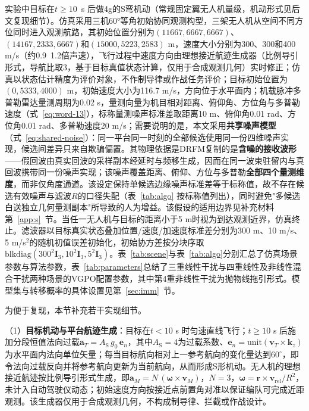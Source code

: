 \documentclass[UTF8,a4paper,zihao=-4]{ctexart}
\begin{document}
实验中目标在\(t\ge10\)~s 后做4g的S弯机动（常规固定翼无人机量级，机动形式见后文复现细节）。仿真采用三机60°等角初始协同观测构型，三架无人机从空间不同方位同时进入观测航路，其初始位置分别为\((11667,6667,6667)\)、\((14167,2333,6667)\)和\((15000,5223,2583)\) m，速度大小分别为300、300和400 m/s（约0.9~1.2倍声速），飞行过程中速度方向由理想接近航迹生成器（比例导引形式，导航比取3，基于目标真值状态计算，仅用于合成观测几何）实时修正；仿真以状态估计精度为评价对象，不作制导律或作战任务评价；目标初始位置为\((0,5333,4000)\) m，初始速度大小为116.7 m/s，方向位于水平面内；机载脉冲多普勒雷达量测周期为0.02 s，量测向量为机目相对距离、俯仰角、方位角与多普勒速度（式~\eqref{eq:word-13}），标称量测噪声标准差取距离10 m、俯仰角0.01 rad、方位角0.01 rad、多普勒速度20 m/s；需要说明的是，本文采用\textbf{共享噪声模型}（式~\eqref{eq:shared-noise}）：同一平台同一时刻的全部候选使用同一份四维噪声实现，候选间差异只来自欺骗偏置。其物理依据是DRFM复制的是\textbf{含噪的接收波形}——假回波由真实回波的采样副本经延时与频移生成，因而在同一波束驻留内与真回波携带同一份噪声实现；该噪声覆盖距离、俯仰、方位与多普勒\textbf{全部四个量测维度}，而非仅角度通道。该设定保持单候选边缘噪声标准差等于标称值，故不存在候选有效噪声与滤波\(R\)的口径失配（表~\ref{tab:algo} 按标称值列出），同时避免"多候选白送独立几何量测副本"所导致的人为增益。该假设的适用边界见补充材料第~\ref{app:s}~节。当任一无人机与目标的距离小于5 m时视为到达观测近界，仿真终止。滤波器以目标真实状态叠加位置/速度/加速度标准差分别为300 m、10 m/s、5 m/s$^2$的随机初值误差初始化，初始协方差按分块序取\(\mathrm{blkdiag}(300^2\boldsymbol I_3,10^2\boldsymbol I_3,5^2\boldsymbol I_3)\)。表~\ref{tab:scene}与表~\ref{tab:algo}分别汇总了仿真场景参数与算法参数，表~\ref{tab:parameters}总结了三重线性干扰与四重线性及非线性混合干扰两种场景的VGPO配置参数，其中第4重非线性干扰为抛物线拖引形式。模型集与转移概率的具体设置见第~\ref{sec:imm}~节。

为便于复现，本节补充若干实现细节。

（1）\textbf{目标机动与平台航迹生成}：目标在\(t<10\) s 时匀速直线飞行；\(t\ge10\) s 后施加分段恒值法向过载\( \boldsymbol a_T=A_{\mathrm{S}}\,g_0\,\boldsymbol e_n\)，其中\(A_{\mathrm{S}}=4\)为过载系数、\(\boldsymbol e_n=\mathrm{unit}(\boldsymbol v_T\times\boldsymbol k_z)\)为水平面内法向单位矢量；每当目标航向相对上一参考航向的变化量达到\(60^\circ\)，即令法向过载反向并将参考航向更新为当前航向，从而形成S形机动。无人机的理想接近航迹按比例导引形式生成，即\(\boldsymbol a_M=N\,(\boldsymbol\omega\times\boldsymbol v_M)\)，\(N=3\)，\(\boldsymbol\omega=\boldsymbol r\times\boldsymbol v_{\mathrm{rel}}/R^2\)，未计入自动驾驶仪动态；初始速度方向按接近点前置角对准以保证编队可完成近距观测。该生成器仅用于合成观测几何，不构成制导律、拦截或作战设计。
\end{document}
